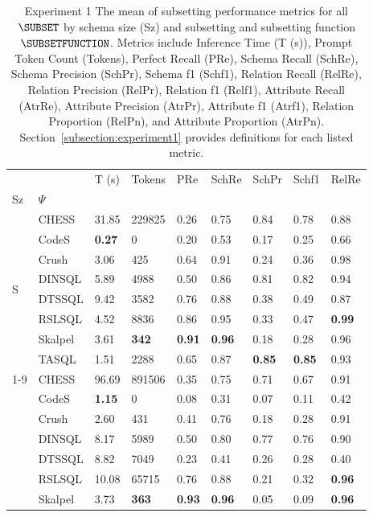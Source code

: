 \begin{table}
\caption{Experiment 1 The mean of subsetting performance metrics for all $\SUBSET$ by schema size (Sz) and subsetting and subsetting 
function $\SUBSETFUNCTION$. Metrics include Inference Time (T (s)), Prompt Token Count (Tokens), Perfect Recall (PRe), 
Schema Recall (SchRe), Schema Precision (SchPr), Schema f1 (Schf1), Relation Recall (RelRe), Relation Precision (RelPr),
Relation f1 (Relf1), Attribute Recall (AtrRe), Attribute Precision (AtrPr), Attribute f1 (Atrf1), Relation Proportion (RelPn), 
and Attribute Proportion (AtrPn). Section~\ref{subsection:experiment1} provides definitions for each listed metric.}
\label{tab:exp1-all-size-schema}
\begin{tabular}{lllllllll}
\toprule
 &  & T (s) & Tokens & PRe & SchRe & SchPr & Schf1 & RelRe \\
Sz & $\Psi$ &  &  &  &  &  &  &  \\
\midrule
\multirow[t]{8}{*}{S} & CHESS & 31.85 & 229825 & 0.26 & 0.75 & 0.84 & 0.78 & 0.88 \\
 & CodeS & \textbf{0.27} & 0 & 0.20 & 0.53 & 0.17 & 0.25 & 0.66 \\
 & Crush & 3.06 & 425 & 0.64 & 0.91 & 0.24 & 0.36 & 0.98 \\
 & DINSQL & 5.89 & 4988 & 0.50 & 0.86 & 0.81 & 0.82 & 0.94 \\
 & DTSSQL & 9.42 & 3582 & 0.76 & 0.88 & 0.38 & 0.49 & 0.87 \\
 & RSLSQL & 4.52 & 8836 & 0.86 & 0.95 & 0.33 & 0.47 & \textbf{0.99} \\
 & Skalpel & 3.61 & \textbf{342} & \textbf{0.91} & \textbf{0.96} & 0.18 & 0.28 & 0.96 \\
 & TASQL & 1.51 & 2288 & 0.65 & 0.87 & \textbf{0.85} & \textbf{0.85} & 0.93 \\
\cline{1-9}
\multirow[t]{8}{*}{M} & CHESS & 96.69 & 891506 & 0.35 & 0.75 & 0.71 & 0.67 & 0.91 \\
 & CodeS & \textbf{1.15} & 0 & 0.08 & 0.31 & 0.07 & 0.11 & 0.42 \\
 & Crush & 2.60 & 431 & 0.41 & 0.76 & 0.18 & 0.28 & 0.91 \\
 & DINSQL & 8.17 & 5989 & 0.50 & 0.80 & 0.77 & 0.76 & 0.90 \\
 & DTSSQL & 8.82 & 7049 & 0.23 & 0.41 & 0.26 & 0.28 & 0.40 \\
 & RSLSQL & 10.08 & 65715 & 0.76 & 0.88 & 0.21 & 0.32 & \textbf{0.96} \\
 & Skalpel & 3.73 & \textbf{363} & \textbf{0.93} & \textbf{0.96} & 0.05 & 0.09 & \textbf{0.96} \\

\end{tabular}
\end{table}

